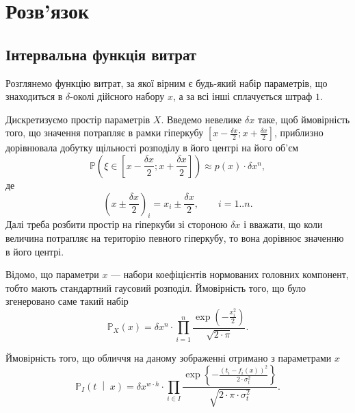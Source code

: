 \section{Розв'язок}

\subsection{Інтервальна функція витрат}

Розглянемо функцію витрат,
за якої вірним є будь-який набір параметрів,
що знаходиться в $\delta$-околі дійсного набору $x$,
а за всі інші сплачується штраф $1$.

Дискретизуємо простір параметрів $X$.
Введемо невелике $\delta x$ таке,
щоб ймовірність того, що значення потрапляє в рамки гіперкубу
$\left[ x - \frac{\delta x}{2}; x + \frac{\delta x}{2} \right]$,
приблизно дорівнювала добутку щільності розподілу в його центрі
на його об'єм
\begin{equation*}
  \mathbb{P}\left( \xi \in \left[ x - \frac{\delta x}{2};
                                  x + \frac{\delta x}{2} \right] \right)
  \approx p\left( x \right) \cdot \delta x^n,
\end{equation*}
де
\begin{equation*}
  \left( x \pm \frac{\delta x}{2} \right)_i = x_i \pm \frac{\delta x}{2},\qquad
  i = 1..n.
\end{equation*}
Далі треба розбити простір на гіперкуби
зі стороною $\delta x$ і вважати,
що коли величина потрапляє на територію певного гіперкубу,
то вона дорівнює значенню в його центрі.

Відомо, що параметри $x$ --- набори коефіцієнтів нормованих головних компонент,
тобто мають стандартний гаусовий розподіл.
Ймовірність того, що було згенеровано саме такий набір
\begin{equation*}
  \mathbb{P}_X\left( x \right)
  = \delta x^n \cdot \prod_{i=1}^n
    \frac{\exp{\left( - \frac{x_i^2}{2} \right)}}{\sqrt{2 \cdot \pi}}.
\end{equation*}

Ймовірність того, що обличчя на даному зображенні отримано з параметрами $x$
\begin{equation*}
  \mathbb{P}_I\left( t \;\middle|\; x \right)
  = \delta x^{w \cdot h} \cdot \prod_{i \in I}
    \frac{\exp{\left\{- \frac{\left( t_i - f_i\left( x \right) \right)^2}
           {2 \cdot \sigma^2_t} \right\}}}
           {\sqrt{2 \cdot \pi \cdot \sigma^2_t}}.
\end{equation*}

